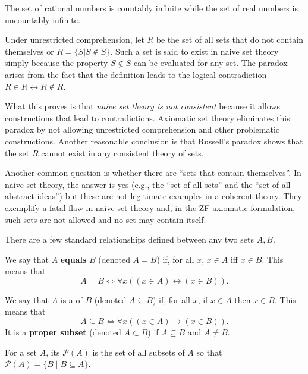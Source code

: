 \begin{example}
The set of rational numbers is countably infinite while the set of real numbers is uncountably infinite.
\end{example}

\begin{example}
Under unrestricted comprehension, let $R$ be the set of all sets that do not contain themselves or $R = \{S|S \notin S\}$.
Such a set is said to exist in naive set theory simply because the property $S \notin S$ can be evaluated for any set.
The paradox arises from the fact that the definition leads to the logical contradiction $R\in R \leftrightarrow R \notin R$.
\end{example}

What this proves is that \emph{naive set theory is not consistent} because it allows constructions that lead to contradictions.
Axiomatic set theory eliminates this paradox by not allowing unrestricted comprehension and other problematic constructions.
Another reasonable conclusion is that Russell's paradox shows that the set $R$ cannot exist in any consistent theory of sets.

Another common question is whether there are ``sets that contain themselves''.
In naive set theory, the answer is yes (e.g., the ``set of all sets'' and the ``set of all abstract ideas'') but these are not legitimate examples in a coherent theory.
They exemplify a fatal flaw in naive set theory and, in the ZF axiomatic formulation, such sets are not allowed and no set may contain itself.

There are a few standard relationships defined between any two sets $A,B$.
\begin{definition}
We say that $A$ \textbf{equals} $B$ (denoted $A=B$) if, for all $x$,  $x\in A$ iff $x\in B$.
This means that
\[ A=B \Leftrightarrow \forall x \left( (x\in A)\leftrightarrow (x\in B) \right). \]
\end{definition}

\begin{definition}
We say that $A$ is a  of $B$ (denoted $A\subseteq B$) if, for all $x$, if $x\in A$ then $x\in B$.
This means that
\[ A\subseteq B  \Leftrightarrow \forall x \left( (x\in A)\rightarrow (x\in B) \right). \]
It is a \textbf{proper subset} (denoted $A\subset B$) if $A\subseteq B$ and $A\neq B$.
\end{definition}

\begin{definition}
For a set $A$, its  $\mathcal{P}(A)$ is the set of all subsets of $A$ so that $\mathcal P(A)=\{B\mid B\subseteq A\}$.
\end{definition}

